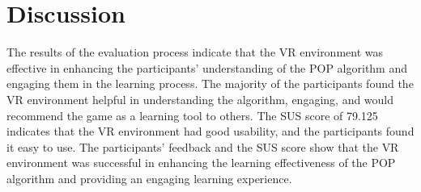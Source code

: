 \section{Discussion}

The results of the evaluation process indicate that the \ac{VR} environment was effective in enhancing the participants' understanding of the \ac{POP} algorithm and engaging them in the learning process. The majority of the participants found the \ac{VR} environment helpful in understanding the algorithm, engaging, and would recommend the game as a learning tool to others. The \ac{SUS} score of 79.125 indicates that the \ac{VR} environment had good usability, and the participants found it easy to use. The participants' feedback and the \ac{SUS} score show that the \ac{VR} environment was successful in enhancing the learning effectiveness of the \ac{POP} algorithm and providing an engaging learning experience.